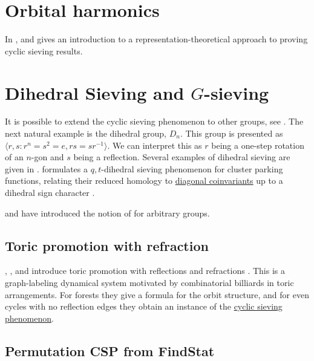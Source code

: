 \section[orbitalHarmonics]{Orbital harmonics}

In \cite{OhRhoades2021},  and 
gives an introduction to a representation-theoretical approach to proving 
cyclic sieving results.


\section[dihedralSieving]{Dihedral Sieving and $G$-sieving}

It is possible to extend the cyclic sieving phenomenon to other groups, see \cite{RaoSuk2020}.
The next natural example is the dihedral group, $D_n$. This group
is presented as $\langle r,s : r^n=s^2=e, rs=sr^{-1} \rangle$.
We can interpret this as $r$ being a one-step rotation of an $n$-gon and $s$ being a reflection.
Several examples of dihedral sieving are given in \cite{RaoSuk2020}.
 formulates a
$q,t$-dihedral sieving phenomenon for cluster parking functions, relating
their reduced homology to \hyperref[diagonalCoinvariantRing]{diagonal
coinvariants} up to a dihedral sign character \cite{JosuatVerges2026x}.

 and  have introduced the notion of  for arbitrary groups.


\subsection[toricPromotionRefraction]{Toric promotion with refraction}

, , and 
introduce toric promotion with reflections and refractions
\cite{AdamsDefantStriker2024x}.  This is a graph-labeling dynamical system
motivated by combinatorial billiards in toric arrangements.  For forests
they give a formula for the orbit structure, and for even cycles with no
reflection edges they obtain an instance of the
\hyperref[cyclicSieving]{cyclic sieving phenomenon}.


\subsection[findstatPermutationCSP]{Permutation CSP from FindStat}

